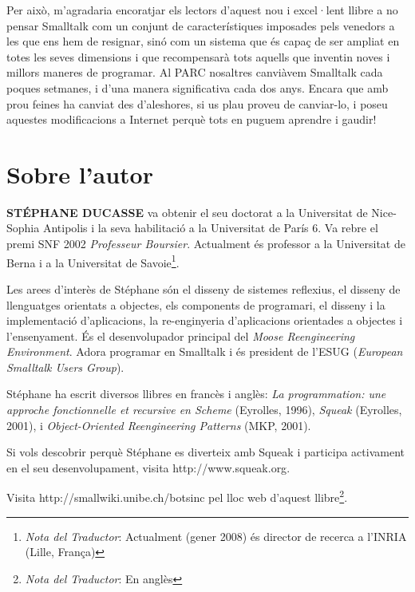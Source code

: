 Per això, m'agradaria encoratjar els lectors d'aquest nou i excel·lent llibre a no pensar Smalltalk com un conjunt de característiques imposades pels venedors a les que ens hem de resignar, sinó com un  sistema que és capaç de ser ampliat en totes les seves dimensions i que recompensarà tots aquells que inventin noves i millors maneres de programar. Al PARC nosaltres canviàvem Smalltalk cada poques setmanes, i d'una manera significativa cada dos anys. Encara que amb prou feines ha canviat des d'aleshores, si us plau proveu de canviar-lo, i poseu aquestes modificacions a Internet perquè tots en puguem aprendre i gaudir!

\chapter{Sobre l'autor}

\noindent
\textbf{STÉPHANE DUCASSE} va obtenir el seu doctorat a la Universitat de Nice-Sophia Antipolis i la seva habilitació a la Universitat de París 6. Va rebre el premi SNF 2002 \emph{Professeur Boursier}. Actualment és professor a la Universitat de Berna i a la Universitat de Savoie\footnote{\emph{Nota del Traductor}: Actualment (gener 2008) és director de recerca a l'INRIA (Lille, França)}.

\vspace{5mm}
\noindent
Les arees d'interès de Stéphane són el disseny de sistemes reflexius, el disseny de llenguatges orientats a objectes, els components de programari, el disseny i la implementació d'aplicacions, la re-enginyeria d'aplicacions orientades a objectes i l'ensenyament. És el desenvolupador principal del \emph{Moose Reengineering Environment}. Adora programar en Smalltalk i és president de l'ESUG (\emph{European Smalltalk Users Group}).

\vspace{5mm}
\noindent
Stéphane ha escrit diversos llibres en francès i anglès: \emph{La programmation: une approche fonctionnelle et recursive en Scheme} (Eyrolles, 1996), \emph{Squeak} (Eyrolles, 2001), i \emph{Object-Oriented Reengineering Patterns} (MKP, 2001).

\vspace{5mm}
\noindent
Si vols descobrir perquè Stéphane es diverteix amb Squeak i participa activament en el seu desenvolupament, visita
\textsf{http://www.squeak.org}.

\vspace{5mm}
\noindent
Visita \textsf{http://smallwiki.unibe.ch/botsinc} pel lloc web d'aquest llibre\footnote{\emph{Nota del Traductor}: En anglès}.


